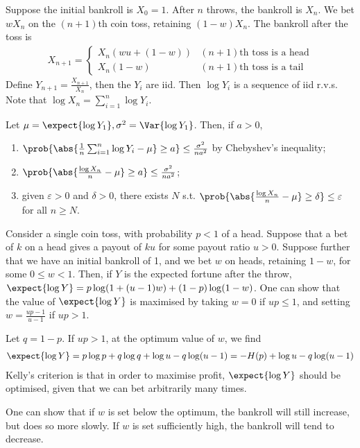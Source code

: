 Suppose the initial bankroll is $X_0 = 1$.
After $n$ throws, the bankroll is $X_n$.
We bet $w X_n$ on the $(n + 1)$th coin toss, retaining $(1-w)X_n$.
The bankroll after the toss is
\begin{align*}
        X_{n+1} = \begin{cases}
    X_n(wu + (1-w)) & (n + 1)\text{th toss is a head} \\
    X_n(1-w) & (n + 1)\text{th toss is a tail}
\end{cases}
    \end{align*}
Define $Y_{n+1} = \frac{X_{n+1}}{X_n}$, then the $Y_i$ are iid.
Then $\log Y_i$ is a sequence of iid r.v.s.
Note that $\log X_n = \sum_{i=1}^n \log Y_i$.
\begin{lemma}
    Let $\mu = \expect{\log Y_1}, \sigma^2 = \Var{\log Y_1}$.
    Then, if $a > 0$,
    \begin{enumerate}
        \item $\prob{\abs{\frac{1}{n} \sum_{i=1}^n \log Y_i - \mu} \geq a} \leq \frac{\sigma^2}{na^2}$ by Chebyshev's inequality;
        \item $\prob{\abs{\frac{\log X_n}{n} - \mu} \geq a} \leq \frac{\sigma^2}{na^2}$;
        \item given $\varepsilon > 0$ and $\delta > 0$, there exists $N$ s.t. $\prob{\abs{\frac{\log X_n}{n} - \mu} \geq \delta} \leq \varepsilon$ for all $n \geq N$.
    \end{enumerate}
\end{lemma}
Consider a single coin toss, with probability $p < 1$ of a head.
Suppose that a bet of $k$ on a head gives a payout of $ku$ for some payout ratio $u > 0$.
Suppose further that we have an initial bankroll of 1, and we bet $w$ on heads, retaining $1 - w$, for some $0 \leq w < 1$.
Then, if $Y$ is the expected fortune after the throw, $\expect{\log Y} = p \log(1 + (u-1)w) + (1-p) \log(1-w)$.
One can show that the value of $\expect{\log Y}$ is maximised by taking $w = 0$ if $up \leq 1$, and setting $w = \frac{up-1}{u-1}$ if $up > 1$.

Let $q = 1-p$.
If $up > 1$, at the optimum value of $w$, we find
\begin{align*}
        \expect{\log Y} = p \log p + q \log q + \log u - q \log(u-1) = -H(p) + \log u - q \log(u-1)
    \end{align*}
Kelly's criterion is that in order to maximise profit, $\expect{\log Y}$ should be optimised, given that we can bet arbitrarily many times.

One can show that if $w$ is set below the optimum, the bankroll will still increase, but does so more slowly.
If $w$ is set sufficiently high, the bankroll will tend to decrease.
